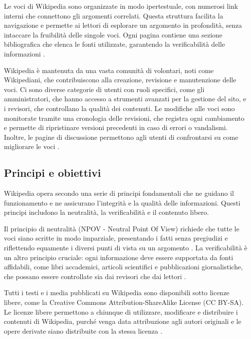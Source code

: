 \documentclass[12pt,a4paper]{report}
\begin{document}
Le voci di Wikipedia sono organizzate in modo ipertestuale, con numerosi link interni che connettono gli argomenti correlati. Questa struttura facilita la navigazione e permette ai lettori di esplorare un argomento in profondità, senza intaccare la fruibilità delle singole voci. Ogni pagina contiene una sezione bibliografica che elenca le fonti utilizzate, garantendo la verificabilità delle informazioni \cite{denning2005wikipedia}.

Wikipedia è mantenuta da una vasta comunità di volontari, noti come Wikipediani, che contribuiscono alla creazione, revisione e manutenzione delle voci. Ci sono diverse categorie di utenti con ruoli specifici, come gli amministratori, che hanno accesso a strumenti avanzati per la gestione del sito, e i revisori, che controllano la qualità dei contenuti. Le modifiche alle voci sono monitorate tramite una cronologia delle revisioni, che registra ogni cambiamento e permette di ripristinare versioni precedenti in caso di errori o vandalismi. Inoltre, le pagine di discussione permettono agli utenti di confrontarsi su come migliorare le voci \cite{reagle2010good}.

\subsection{Principi e obiettivi}

Wikipedia opera secondo una serie di principi fondamentali che ne guidano il funzionamento e ne assicurano l'integrità e la qualità delle informazioni. Questi principi includono la neutralità, la verificabilità e il contenuto libero.

Il principio di neutralità (NPOV - Neutral Point Of View) richiede che tutte le voci siano scritte in modo imparziale, presentando i fatti senza pregiudizi e riflettendo equamente i diversi punti di vista su un argomento \cite{reagle2010good}. La verificabilità è un altro principio cruciale: ogni informazione deve essere supportata da fonti affidabili, come libri accademici, articoli scientifici e pubblicazioni giornalistiche, che possano essere controllate sia dai revisori che dai lettori \cite{denning2005wikipedia}.

Tutti i testi e i media pubblicati su Wikipedia sono disponibili sotto licenze libere, come la Creative Commons Attribution-ShareAlike License (CC BY-SA). Le licenze libere permettono a chiunque di utilizzare, modificare e distribuire i contenuti di Wikipedia, purché venga data attribuzione agli autori originali e le opere derivate siano distribuite con la stessa licenza \cite{jemielniak2014wikipedia}.
\end{document}
